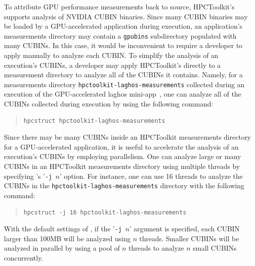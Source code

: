 To  attribute GPU performance measurements back to source, HPCToolkit's \hpcstruct{} supports analysis of NVIDIA CUBIN binaries. Since many CUBIN binaries may be loaded  by a GPU-accelerated application during execution,  an application's measurements directory may contain a {\tt gpubins} subdirectory populated with many CUBINs. In this case, it would be inconvenient to require a developer to apply \hpcstruct{} manually to analyze each CUBIN. To simplify the analysis of an execution's CUBINs, a developer may apply HPCToolkit's \hpcstruct{} directly to a measurement directory to analyze all of the CUBINs it contains. Namely, for a measurements directory {\tt hpctoolkit-laghos-measurements} collected during an execution of the GPU-accelerated laghos mini-app~\cite{laghos}, one can analyze all of the CUBINs collected during execution by using the following command:

\begin{quote}
\begin{verbatim}
hpcstruct hpctoolkit-laghos-measurements
\end{verbatim}
\end{quote}


Since there may be many CUBINs inside an HPCToolkit measurements directory for a GPU-accelerated application, it is useful to accelerate the analysis of an execution's CUBINs by employing parallelism. One can analyze large or many CUBINs in an HPCToolkit measurements directory using multiple threads by specifying \hpcstruct's '\verb|-j|~$n$' option. For instance, one can use 16 threads to analyze the CUBINs in the {\tt hpctoolkit-laghos-measurements} directory with the following command:

\begin{quote}
\begin{verbatim}
hpcstruct -j 16 hpctoolkit-laghos-measurements
\end{verbatim}
\end{quote}

With the default settings of \hpcstruct{}, if the '\verb|-j|~$n$' argument is specified, each CUBIN larger than 100MB will be analyzed using $n$ threads. Smaller CUBINs will be analyzed in parallel by using a pool of $n$ threads to analyze $n$ small CUBINs concurrently. 


